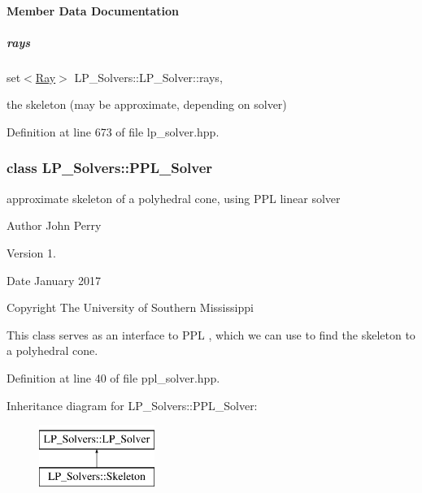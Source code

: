 \paragraph{Member Data Documentation}
\mbox{\label{group___c_l_s_solvers_ad4c9fb3708c156496c23515c8e841374}} 
\subparagraph{\texorpdfstring{rays}{rays}}
{\footnotesize\ttfamily set$<$\hyperlink{group___c_l_s_solvers_class_l_p___solvers_1_1_ray}{Ray}$>$ L\+P\+\_\+\+Solvers\+::\+L\+P\+\_\+\+Solver\+::rays\hspace{0.3cm}{\ttfamily [mutable]}, {\ttfamily [protected]}}

the skeleton (may be approximate, depending on solver) 

Definition at line 673 of file lp\+\_\+solver.\+hpp.

\label{class_l_p___solvers_1_1_p_p_l___solver}
\subsubsection{class L\+P\+\_\+\+Solvers\+:\+:P\+P\+L\+\_\+\+Solver}
approximate skeleton of a polyhedral cone, using P\+PL linear solver 

\begin{DoxyAuthor}{Author}
John Perry 
\end{DoxyAuthor}
\begin{DoxyVersion}{Version}
1. 
\end{DoxyVersion}
\begin{DoxyDate}{Date}
January 2017 
\end{DoxyDate}
\begin{DoxyCopyright}{Copyright}
The University of Southern Mississippi
\end{DoxyCopyright}
This class serves as an interface to P\+PL \cite{BagnaraHZ08SCP}, which we can use to find the skeleton to a polyhedral cone. 

Definition at line 40 of file ppl\+\_\+solver.\+hpp.

Inheritance diagram for L\+P\+\_\+\+Solvers\+:\+:P\+P\+L\+\_\+\+Solver\+:\begin{figure}[H]
\begin{center}
\leavevmode
\includegraphics[height=2.000000cm]{group___c_l_s_solvers}
\end{center}
\end{figure}
